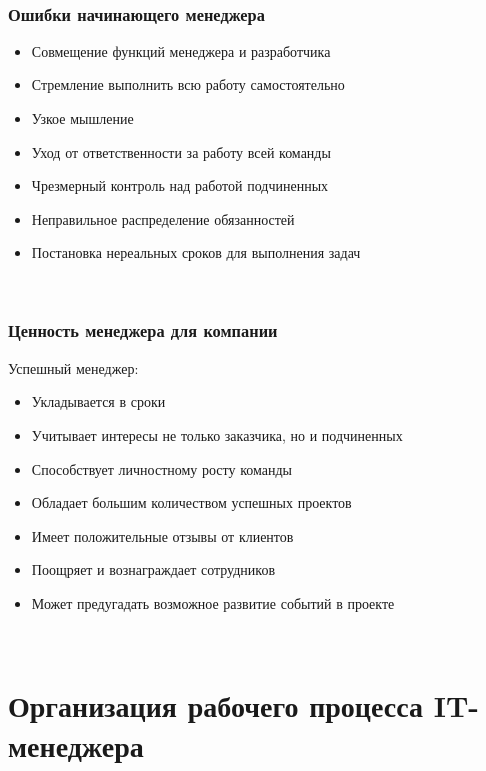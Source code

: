 \documentclass{../industrial-development}
\begin{document}
{{{{{{{{{{{{{{{~\cite{How_to_be_a_good_IT-manager}



\begin{frame} \frametitle{Ошибки начинающего менеджера}
\begin{itemize}	
		\item Совмещение функций менеджера и разработчика	
		\item Стремление выполнить всю работу самостоятельно
	 	\item Узкое мышление
	 	\item Уход от ответственности за работу всей команды
		\item Чрезмерный контроль над работой подчиненных
	 	\item Неправильное распределение обязанностей
	 	\item Постановка нереальных сроков для выполнения задач
 \end{itemize}
\end{frame}
\lecturenotes

~\cite{How_to_be_a_good_IT-manager}

\begin{frame} \frametitle{Ценность менеджера для компании}
 \begin{block}{Успешный менеджер:}
\begin{itemize}
  \item Укладывается в сроки
  \item Учитывает интересы не только заказчика, но и подчиненных 
  \item Способствует личностному росту команды
  \item Обладает большим количеством успешных проектов
  \item Имеет положительные отзывы от клиентов
  \item Поощряет и вознаграждает сотрудников
  \item Может предугадать возможное развитие событий в проекте

  \end{itemize}
 \end{block}
\end{frame}
\lecturenotes


~\cite{How_to_be_a_good_IT-manager}

\section{Организация рабочего процесса IT-менеджера}

}}}}}}}}}}}}}}}
\end{document}
